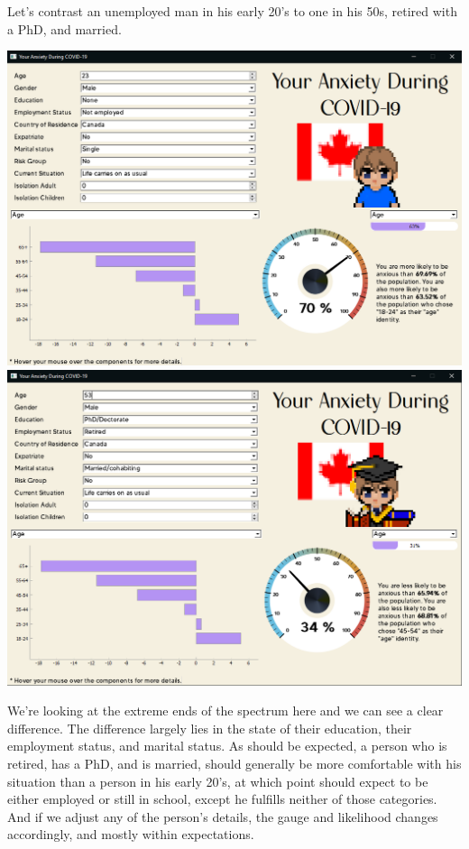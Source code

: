 \documentclass[fontsize=11pt]{article}
\begin{document}
    Let’s contrast an unemployed man in his early 20’s to one in his 50s, retired with a PhD, and married.
    \begin{center}
        \includegraphics[scale=0.30]{img/casestudy_screenshot_1}
        \includegraphics[scale=0.30]{img/casestudy_screenshot_2}
    \end{center}

    We’re looking at the extreme ends of the spectrum here and we can see a clear difference. The difference largely lies in the state of their education, their employment status, and marital status. As should be expected, a person who is retired, has a PhD, and is married, should generally be more comfortable with his situation than a person in his early 20’s, at which point should expect to be either employed or still in school, except he fulfills neither of those categories. And if we adjust any of the person’s details, the gauge and likelihood changes accordingly, and mostly within expectations. \\
\end{document}
